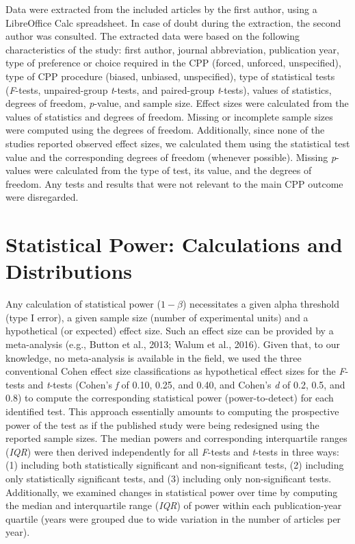 \documentclass[authordate, meta]{jote-new-article}
\begin{document}
	Data were extracted from the included articles by the first author, using a LibreOffice Calc spreadsheet. In case of doubt during the extraction, the second author was consulted. The extracted data were based on the following characteristics of the study: first author, journal abbreviation, publication year, type of preference or choice required in the CPP (forced, unforced, unspecified), type of CPP procedure (biased, unbiased, unspecified), type of statistical tests (\emph{F}-tests, unpaired-group \emph{t}-tests, and paired-group \emph{t}-tests), values of statistics, degrees of freedom, \emph{p}-value, and sample size. Effect sizes were calculated from the values of statistics and degrees of freedom. Missing or incomplete sample sizes were computed using the degrees of freedom. Additionally, since none of the studies reported observed effect sizes, we calculated them using the statistical test value and the corresponding degrees of freedom (whenever possible). Missing \emph{p}-values were calculated from the type of test, its value, and the degrees of freedom. Any tests and results that were not relevant to the main CPP outcome were disregarded.



	\section{Statistical Power: Calculations and Distributions}



	Any calculation of statistical power ($1-\beta$) necessitates a given alpha threshold (type I error), a given sample size (number of experimental units) and a hypothetical (or expected) effect size. Such an effect size can be provided by a meta-analysis (e.g., Button et al., 2013; Walum et al., 2016). Given that, to our knowledge, no meta-analysis is available in the field, we used the three conventional Cohen effect size classifications as hypothetical effect sizes for the \emph{F}-tests and \emph{t}-tests (Cohen's \emph{f} of 0.10, 0.25, and 0.40, and Cohen's \emph{d} of 0.2, 0.5, and 0.8) to compute the corresponding statistical power (power-to-detect) for each identified test. This approach essentially amounts to computing the prospective power of the test as if the published study were being redesigned using the reported sample sizes. The median powers and corresponding interquartile ranges (\emph{IQR}) were then derived independently for all \emph{F}-tests and \emph{t}-tests in three ways: (1) including both statistically significant and non-significant tests, (2) including only statistically significant tests, and (3) including only non-significant tests. Additionally, we examined changes in statistical power over time by computing the median and interquartile range (\emph{IQR}) of power within each publication-year quartile (years were grouped due to wide variation in the number of articles per year).
\end{document}
